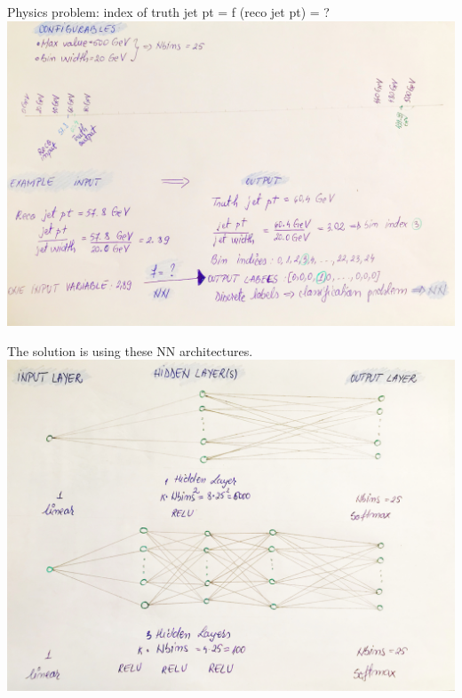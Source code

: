 \begin{frame}{Physics problem: index of truth jet pt = f (reco jet pt) = ?}
\centering
\includegraphics[height=0.80\textheight]{./plots/PhysicsProblem.jpg}
\end{frame}
\clearpage

\begin{frame}{The solution is using these NN architectures.}
\centering
\includegraphics[height=0.80\textheight]{./plots/NNArchitecture.jpg}
\end{frame}
\clearpage

